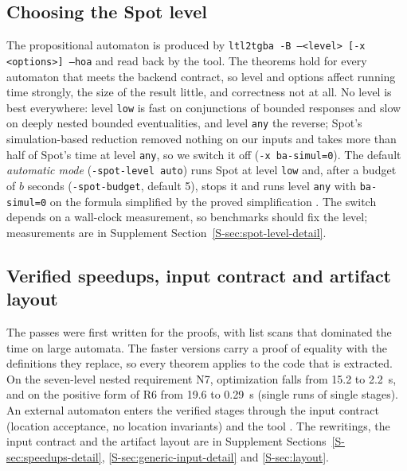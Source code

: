 \documentclass[preprint,12pt]{elsarticle}
\let\pathfragile\path
\DeclareRobustCommand\path{\pathfragile}
\begin{document}
\subsection{Choosing the Spot level}
\label{sec:spot-level}
The propositional automaton is produced by \texttt{ltl2tgba -B --<level> [-x <options>] --hoa} and read back by the tool. The theorems hold for every automaton that meets the backend contract, so level and options affect running time strongly, the size of the result little, and correctness not at all. No level is best everywhere: level \texttt{low} is fast on conjunctions of bounded responses and slow on deeply nested bounded eventualities, and level \texttt{any} the reverse; Spot's simulation-based reduction removed nothing on our inputs and takes more than half of Spot's time at level \texttt{any}, so we switch it off (\texttt{-x ba-simul=0}). The default \emph{automatic mode} (\texttt{-spot-level auto}) runs Spot at level \texttt{low} and, after a budget of $b$ seconds (\texttt{-spot-budget}, default 5), stops it and runs level \texttt{any} with \texttt{ba-simul=0} on the formula simplified by the proved simplification .  The switch depends on a wall-clock measurement, so benchmarks should fix the level; measurements are in Supplement Section~\ref{S-sec:spot-level-detail}.

\subsection{Verified speedups, input contract and artifact layout}
\label{sec:speedups}
The passes were first written for the proofs, with list scans that dominated the time on large automata. The faster versions carry a proof of equality with the definitions they replace, so every theorem applies to the code that is extracted. On the seven-level nested requirement N7, optimization falls from 15.2 to 2.2~s, and on the positive form of R6 from 19.6 to 0.29~s (single runs of single stages). An external automaton enters the verified stages through the input contract (location acceptance, no location invariants) and the tool . The rewritings, the input contract and the artifact layout are in Supplement Sections~\ref{S-sec:speedups-detail}, \ref{S-sec:generic-input-detail} and \ref{S-sec:layout}.
\end{document}
